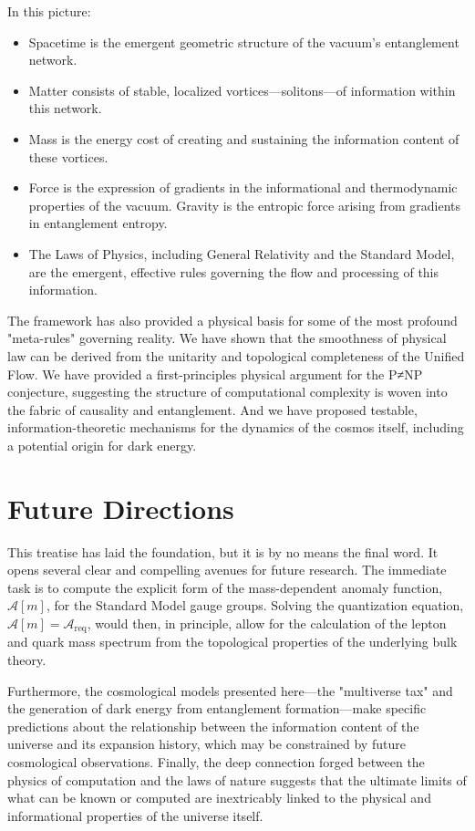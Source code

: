 \documentclass[11pt, letterpaper]{report}
\theoremstyle{plain} %
\theoremstyle{definition} %
\theoremstyle{remark} %
\begin{document}
In this picture:
\begin{itemize}
    \item Spacetime is the emergent geometric structure of the vacuum's entanglement network.
    \item Matter consists of stable, localized vortices—solitons—of information within this network.
    \item Mass is the energy cost of creating and sustaining the information content of these vortices.
    \item Force is the expression of gradients in the informational and thermodynamic properties of the vacuum. Gravity is the entropic force arising from gradients in entanglement entropy.
    \item The Laws of Physics, including General Relativity and the Standard Model, are the emergent, effective rules governing the flow and processing of this information.
\end{itemize}
The framework has also provided a physical basis for some of the most profound "meta-rules" governing reality. We have shown that the smoothness of physical law can be derived from the unitarity and topological completeness of the Unified Flow. We have provided a first-principles physical argument for the P≠NP conjecture, suggesting the structure of computational complexity is woven into the fabric of causality and entanglement. And we have proposed testable, information-theoretic mechanisms for the dynamics of the cosmos itself, including a potential origin for dark energy.

\section{Future Directions}

This treatise has laid the foundation, but it is by no means the final word. It opens several clear and compelling avenues for future research. The immediate task is to compute the explicit form of the mass-dependent anomaly function, $\mathcal{A}[m]$, for the Standard Model gauge groups. Solving the quantization equation, $\mathcal{A}[m] = \mathcal{A}_{\text{req}}$, would then, in principle, allow for the calculation of the lepton and quark mass spectrum from the topological properties of the underlying bulk theory.

Furthermore, the cosmological models presented here—the "multiverse tax" and the generation of dark energy from entanglement formation—make specific predictions about the relationship between the information content of the universe and its expansion history, which may be constrained by future cosmological observations. Finally, the deep connection forged between the physics of computation and the laws of nature suggests that the ultimate limits of what can be known or computed are inextricably linked to the physical and informational properties of the universe itself.
\end{document}
